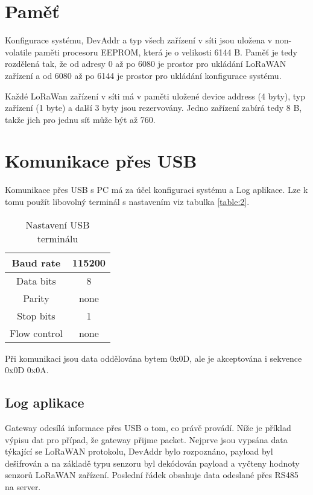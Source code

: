 \section{Paměť}
Konfigurace systému, DevAddr a typ všech zařízení v síti jsou uložena v non-volatile paměti procesoru EEPROM, která je o velikosti 6144 B. 
Paměť je tedy rozdělená tak, že od adresy 0 až po 6080 je prostor pro ukládání LoRaWAN zařízení a od 6080 až po 6144 je prostor pro ukládání konfigurace systému.

Každé LoRaWan zařízení v síti má v paměti uložené device address (4 byty), typ zařízení (1 byte) a další 3 byty jsou rezervovány. 
Jedno zařízení zabírá tedy 8 B, takže jich pro jednu síť může být až 760.


\section{Komunikace přes USB}
Komunikace přes USB s PC má za účel konfiguraci systému a Log aplikace. Lze k tomu použít libovolný terminál s nastavením viz tabulka \ref{table:2}.

\begin{table}[!h]
    \centering
    \begin{tabular}{ |c|c| }
     \hline

     Baud rate              & 115200           \\ \hline
     Data bits              & 8                 \\ \hline
     Parity                 & none              \\ \hline
     Stop bits              & 1                 \\ \hline
     Flow control           & none               \\ \hline

    \end{tabular}
    \caption{Nastavení USB terminálu}
    \label{table:3}
\end{table}

Při komunikaci jsou data oddělována bytem 0x0D, ale je akceptována i sekvence 0x0D 0x0A. 

\subsection{Log aplikace}
Gateway odesílá informace přes USB o tom, co právě provádí. Níže je příklad výpisu dat pro případ, že gateway přijme packet. Nejprve jsou vypsána data týkající se LoRaWAN protokolu, DevAddr bylo rozpoznáno, payload byl dešifrován a na základě typu senzoru byl dekódován payload a vyčteny hodnoty senzorů LoRaWAN zařízení. Poslední řádek obsahuje data odeslané přes RS485 na server.


